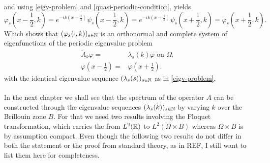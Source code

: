 and using \eqref{eigv-problem} and \eqref{quasi-periodic-condition}, yields
		\[ \varphi_{s}(x - \frac{1}{2}, k) = e^{-ik(x - \frac{1}{2})} \psi_{s}(x - \frac{1}{2}, k) = e^{-ik(x + \frac{1}{2})} \psi_{s}(x + \frac{1}{2}, k) = \varphi_{s}(x + \frac{1}{2}, k). \]
Which shows that $(\varphi_{s}(\cdot, k))_{s \in \mathbb{N}}$ is an orthonormal and complete system of eigenfunctions of the periodic eigenvalue problem
	\begin{eqnarray}
		\tilde{A}_{k} \varphi = & \lambda_{s}(k)
		 \varphi \text{ on } \Omega, \label{mod-eigv-problem} \\
		 \varphi(x - \frac{1}{2}) = & \varphi(x + \frac{1}{2}). \label{periodic-condition}
	\end{eqnarray}
with the identical eigenvalue sequence $(\lambda_{s}(s))_{s \in \mathbb{N}}$ as in \eqref{eigv-problem}.
~\\ ~\\
In the next chapter we shall see that the spectrum of the operator $A$ can be constructed through the eigenvalue sequences $(\lambda_{s}(k))_{s \in \mathbb{N}}$ by varying $k$ over the Brillouin zone $B$. For that we need two results involving the Floquet transformation, which carries the from $L^{2}(\mathbb{R})$ to $L^{2}(\Omega \times B)$ whereas $\Omega \times B$ is by assumption compact. Even though the following two results do not differ in both the statement or the proof from standard theory, as in REF, I still want to list them here for completeness. %
